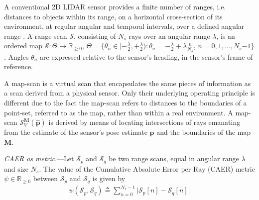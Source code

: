 \begin{definition}
  \label{def:definition_1}
  A conventional 2D LIDAR sensor provides a finite number of ranges,
  i.e. distances to objects within its range, on a horizontal cross-section of
  its environment, at regular angular and temporal intervals, over a defined
  angular range \cite{Cooper2018b}. A range scan $\mathcal{S}$, consisting
  of $N_s$ rays over an angular range $\lambda$, is an ordered map
  $\mathcal{S} : \Theta \rightarrow \mathbb{R}_{\geq 0}$, $\Theta =
  \{\theta_n \in [-\frac{\lambda}{2}, +\frac{\lambda}{2}) : \theta_n =
  -\frac{\lambda}{2} + \lambda \frac{n}{N_s}$, $n = 0,1,\dots, N_s$$-$$1$$\}$.
  Angles $\theta_n$ are expressed relative to the sensor's heading, in the
  sensor's frame of reference.
\end{definition}

\begin{definition}
  \label{def:definition_2}
  A map-scan is a virtual scan that encapsulates the same pieces of information
  as a scan derived from a physical sensor. Only their underlying operating
  principle is different due to the fact the map-scan refers to distances to
  the boundaries of a point-set, referred to as the map, rather than within a
  real environment. A map-scan $\mathcal{S}_V^{\bm{M}}(\hat{\bm{p}})$ is
  derived by means of locating intersections of rays emanating from the
  estimate of the sensor's pose estimate $\hat{\bm{p}}$ and the boundaries of
  the map $\bm{M}$.
\end{definition}

\begin{definition}
  \label{def:definition_3} \textit{CAER as metric}.---Let
  $\mathcal{S}_p$ and $\mathcal{S}_q$ be two range scans, equal in angular
  range $\lambda$ and size $N_s$. The value of the Cumulative Absolute Error
  per Ray (CAER) metric $\psi \in \mathbb{R}_{\geq 0}$ between $\mathcal{S}_p$
  and $\mathcal{S}_q$ is given by
  \begin{align}
    \psi(\mathcal{S}_p,\mathcal{S}_q) \triangleq \sum\limits_{n=0}^{N_s-1} \Big| \mathcal{S}_p[n]-\mathcal{S}_q[n]\Big| \nonumber
  \end{align}
\end{definition}

